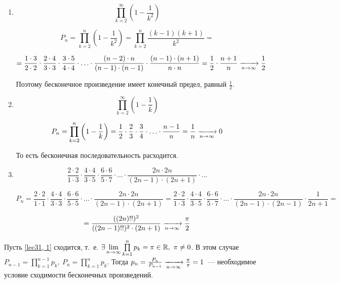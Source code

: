 \documentclass[../../main.tex]{subfiles}
\begin{document}
	\begin{example}
		\begin{enumerate}[label=\arabic*)]
			\item \[ \prod\limits_{k = 2}^{\infty} \left(1 - \frac{1}{k^2}\right) \]
			
			\[P_n = \prod\limits_{k = 2}^{n} \left(1 - \frac{1}{k^2}\right) = 
			\prod\limits_{k = 2}^{n} \frac{(k - 1)(k + 1)}{k^2} = \]
			
			\[= \frac{1 \cdot 3}{2 \cdot 2} \cdot \frac{2 \cdot 4}{3 \cdot 3} \cdot 
			\frac{3 \cdot 5}{4 \cdot 4} \cdot \ldots \cdot \frac{(n - 2) \cdot n}{(n - 
			1) \cdot (n - 1)} \cdot \frac{(n - 1) \cdot (n + 1)}{n \cdot n} = 
			\frac{1}{2} \cdot \frac{n + 1}{n} \xrightarrow[n \to \infty]{} \frac{1}{2}\]
			
			Поэтому бесконечное произведение имеет конечный предел, равный 
			$\frac{1}{2}$.
			
			\item  \[ \prod\limits_{k = 2}^{\infty} \left(1 - \frac{1}{k}\right) \]
			
			\[P_n = \prod\limits_{k = 2}^{n} \left(1 - \frac{1}{k}\right) = \frac{1}{2} 
			\cdot \frac{2}{3} \cdot \frac{3}{4} \cdot \ldots \cdot \frac{n - 1}{n} = 
			\frac{1}{n} \xrightarrow[n \to \infty]{} 0\]
			
			То есть бесконечная последовательность расходится.
			
			\item \[ \frac{2 \cdot 2}{1 \cdot 3} \cdot \frac{4 \cdot 4}{3 \cdot 5} 
			\cdot \frac{6 \cdot 6}{5 \cdot 7} \cdot \ldots \cdot \frac{2n \cdot 2n}{(2n 
			- 1) \cdot (2n + 1)} \cdot \ldots\]
			
			\[ P_n = \frac{2 \cdot 2}{1 \cdot 1} \cdot \frac{4 \cdot 4}{3 \cdot 3} 
			\cdot \frac{6 \cdot 6}{5 \cdot 5} \cdot \ldots \cdot \frac{2n \cdot 2n}{(2n 
			- 1) \cdot (2n + 1)} = \frac{2 \cdot 2}{1 \cdot 3} \cdot \frac{4 \cdot 4}{3 
			\cdot 5} \cdot \frac{6 \cdot 6}{5 \cdot 7} \cdot \ldots \cdot \frac{2n 
			\cdot 2n}{(2n - 1) \cdot (2n - 1)} \cdot \frac{1}{2n + 1} = \]
			
			\[= \frac{((2n)!!)^2}{((2n - 1)!!)^2 \cdot (2n + 1)} \xrightarrow[n \to \infty]{} 
			\frac{\pi}{2}\]
		\end{enumerate}
	\end{example}
	Пусть \eqref{lec31, 1} сходится, т.~е. $\exists \lim\limits_{n \to \infty} 
	\prod\limits_{k = 1}^{n} p_k = \pi \in \mathbb{R},\ \pi \neq 0$. В этом случае $P_{n 
	- 1} = \prod\limits_{k = 1}^{n - 1}p_k,\ P_{n} = \prod\limits_{k = 
	1}^{n}p_k$. Тогда $p_n = \frac{P_n}{P_{n - 1}} \xrightarrow[n \to \infty]{} 
	\frac{\pi}{\pi} = 1$~--- необходимое условие сходимости бесконечных 
	произведений.
		
\end{document}
